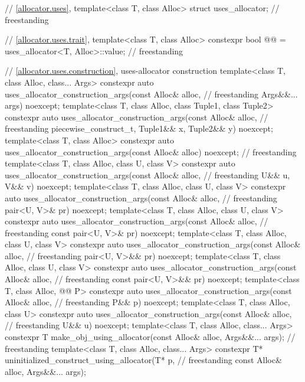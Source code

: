 \begin{codeblock}
{  // \ref{allocator.uses}, 
  template<class T, class Alloc> struct uses_allocator;                             // freestanding

  // \ref{allocator.uses.trait}, 
  template<class T, class Alloc>
    constexpr bool @@ = uses_allocator<T, Alloc>::value;              // freestanding

  // \ref{allocator.uses.construction}, uses-allocator construction
  template<class T, class Alloc, class... Args>
    constexpr auto uses_allocator_construction_args(const Alloc& alloc,             // freestanding
                                                    Args&&... args) noexcept;
  template<class T, class Alloc, class Tuple1, class Tuple2>
    constexpr auto uses_allocator_construction_args(const Alloc& alloc,             // freestanding
                                                    piecewise_construct_t,
                                                    Tuple1&& x, Tuple2&& y) noexcept;
  template<class T, class Alloc>
    constexpr auto uses_allocator_construction_args(const Alloc& alloc) noexcept;   // freestanding
  template<class T, class Alloc, class U, class V>
    constexpr auto uses_allocator_construction_args(const Alloc& alloc,             // freestanding
                                                    U&& u, V&& v) noexcept;
  template<class T, class Alloc, class U, class V>
    constexpr auto uses_allocator_construction_args(const Alloc& alloc,             // freestanding
                                                    pair<U, V>& pr) noexcept;
  template<class T, class Alloc, class U, class V>
    constexpr auto uses_allocator_construction_args(const Alloc& alloc,             // freestanding
                                                    const pair<U, V>& pr) noexcept;
  template<class T, class Alloc, class U, class V>
    constexpr auto uses_allocator_construction_args(const Alloc& alloc,             // freestanding
                                                    pair<U, V>&& pr) noexcept;
  template<class T, class Alloc, class U, class V>
    constexpr auto uses_allocator_construction_args(const Alloc& alloc,             // freestanding
                                                    const pair<U, V>&& pr) noexcept;
  template<class T, class Alloc, @@ P>
    constexpr auto uses_allocator_construction_args(const Alloc& alloc,             // freestanding
                                                    P&& p) noexcept;
  template<class T, class Alloc, class U>
    constexpr auto uses_allocator_construction_args(const Alloc& alloc,             // freestanding
                                                    U&& u) noexcept;
  template<class T, class Alloc, class... Args>
    constexpr T make_obj_using_allocator(const Alloc& alloc, Args&&... args);       // freestanding
  template<class T, class Alloc, class... Args>
    constexpr T* uninitialized_construct_using_allocator(T* p,                      // freestanding
                                                         const Alloc& alloc, Args&&... args);

}
\end{codeblock}

